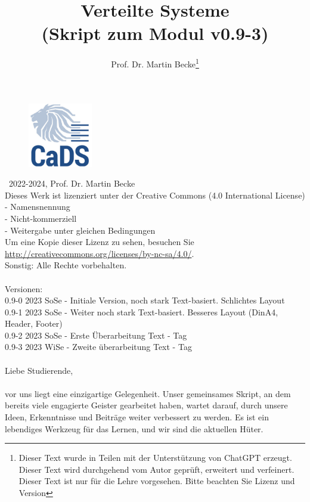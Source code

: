 \documentclass[a4paper]{article}
\title{Verteilte Systeme\\ (Skript zum Modul v0.9-3)}
\author{Prof. Dr. Martin Becke\footnote{Dieser Text wurde in Teilen mit der Unterstützung von ChatGPT erzeugt. Dieser Text{} wird durchgehend vom Autor geprüft, erweitert und verfeinert. Dieser Text ist nur für die Lehre vorgesehen. Bitte beachten Sie Lizenz und Version}}
\begin{document}
\maketitle
\vspace*{\fill} %
\begin{figure}[h]
  \centering
  \includegraphics[width=0.25\textwidth]{fig/graphics/CADS_Logo_Quadrat_300x300_RGB_72dpi.jpg} %
\end{figure}
\vspace*{\fill}

\newpage
\noindent
\textcopyright\ 2022-2024, Prof. Dr. Martin Becke\\
Dieses Werk ist lizenziert unter der Creative Commons (4.0 International License)\\
- Namensnennung\\ - Nicht-kommerziell\\ - Weitergabe unter gleichen Bedingungen \\Um eine Kopie dieser Lizenz zu sehen, besuchen Sie\\ \url{http://creativecommons.org/licenses/by-nc-sa/4.0/}.\\
Sonstig: Alle Rechte vorbehalten.
\noindent
\\\\
Versionen:\\
0.9-0 2023 SoSe - Initiale Version, noch stark Text-basiert. Schlichtes Layout\\
0.9-1 2023 SoSe - Weiter noch stark Text-basiert. Besseres Layout (DinA4, Header, Footer)\\
0.9-2 2023 SoSe - Erste Überarbeitung Text - Tag
\\
0.9-3 2023 WiSe - Zweite überarbeitung Text - Tag
\\\\
Liebe Studierende,\\\\ vor uns liegt eine einzigartige Gelegenheit. Unser gemeinsames Skript, an dem bereits viele engagierte Geister gearbeitet haben, wartet darauf, durch unsere Ideen, Erkenntnisse und Beiträge weiter verbessert zu werden. Es ist ein lebendiges Werkzeug für das Lernen, und wir sind die aktuellen Hüter.
\end{document}
